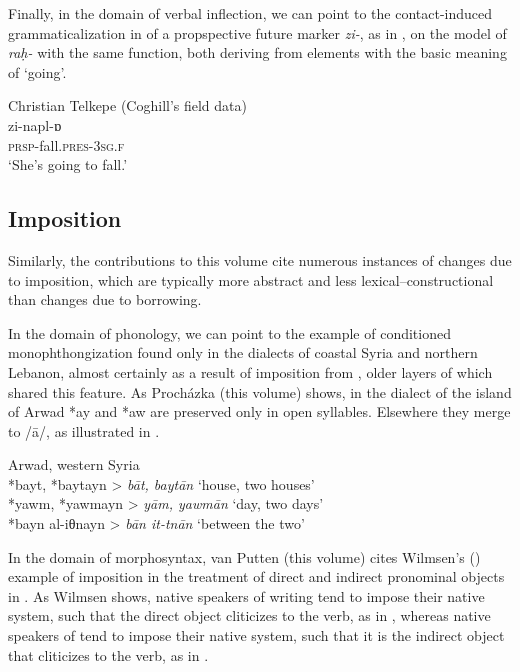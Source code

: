 \documentclass[output=paper]{langsci/langscibook}
\begin{document}
Finally, in the domain of verbal {inflection}, we can point to the {contact-induced grammaticalization} in  of a propspective {future} marker \textit{zi-}, as in , on the model of  \textit{raḥ-} with the same function, both deriving from elements with the basic meaning of `going'.

\ea\label{introgoing}Christian Telkepe  (Coghill’s field data)\\
\gll zi-napl-ɒ\\
     \textsc{prsp-}fall.\textsc{pres}{}-\textsc{3sg.f}\\
\glt ‘She’s going to fall.’
\z

\subsection{Imposition}


Similarly, the contributions to this volume cite numerous instances of changes due to {imposition}, which are typically more abstract and less lexical--constructional than changes due to borrowing.


In the domain of phonology, we can point to the example of conditioned monophthongization found only in the  dialects of coastal Syria and northern Lebanon, almost certainly as a result of {imposition} from , older layers of which shared this feature. As Procházka (this volume)  shows, in the dialect of the island of Arwad *ay and *aw are preserved only in open syllables. Elsewhere they {merge} to /ā/, as illustrated in .


\ea\label{intromonophth}
{Arwad, western Syria \citep[278]{Procházka2013}} \\
    *bayt, *baytayn > \textit{bāt, baytān} ‘house, two houses’\\
*yawm, *yawmayn >  \textit{yām, yawmān} ‘day, two days’\\
*bayn al-iθnayn > \textit{bān it-tnān} ‘between the two’\\
\z

In the domain of morphosyntax, van Putten (this volume) cites Wilmsen's (\citeyear{Wilmsen2010}) example of {imposition} in the treatment of direct and indirect pronominal objects in . As Wilmsen shows, native speakers of  writing  tend to impose their native system, such that the direct object cliticizes to the verb, as in , whereas native speakers of   tend to impose their native system, such that it is the indirect object that cliticizes to the verb, as in .
\end{document}
